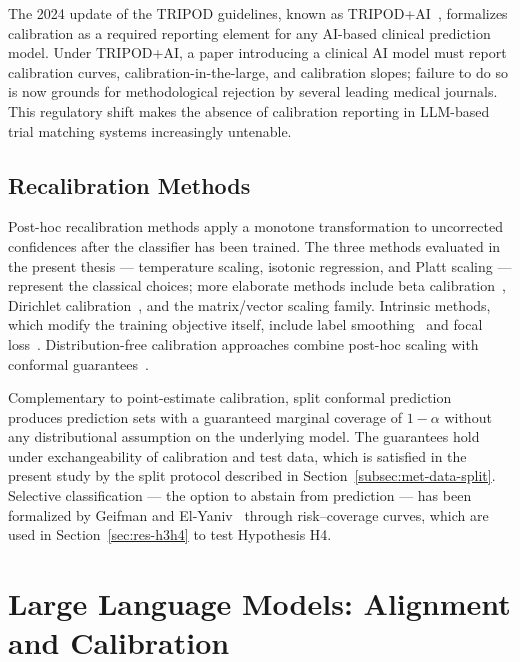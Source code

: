 The 2024 update of the TRIPOD guidelines, known as 
TRIPOD+AI~\cite{collins2024tripod}, formalizes calibration as a 
required reporting element for any AI-based clinical prediction model. 
Under TRIPOD+AI, a paper introducing a clinical AI model must report 
calibration curves, calibration-in-the-large, and calibration slopes; 
failure to do so is now grounds for methodological rejection by 
several leading medical journals. This regulatory shift makes the 
absence of calibration reporting in LLM-based trial matching systems 
increasingly untenable.

\subsection{Recalibration Methods}
\label{subsec:sota-recalibration}

Post-hoc recalibration methods apply a monotone transformation to 
uncorrected confidences after the classifier has been trained. The 
three methods evaluated in the present thesis --- temperature scaling, 
isotonic regression, and Platt scaling --- represent the classical 
choices; more elaborate methods include beta 
calibration~\cite{kull2017beta}, Dirichlet 
calibration~\cite{kull2019dirichlet}, and the matrix/vector scaling 
family. Intrinsic methods, which modify the training objective itself, 
include label smoothing~\cite{muller2019labelsmoothing} and focal 
loss~\cite{mukhoti2020focal}. Distribution-free calibration approaches 
combine post-hoc scaling with conformal 
guarantees~\cite{gupta2021distributionfree}.

Complementary to point-estimate calibration, split conformal 
prediction~\cite{vovk2005, angelopoulos2023conformal} produces 
prediction sets with a guaranteed marginal coverage of $1 - \alpha$ 
without any distributional assumption on the underlying model. The 
guarantees hold under exchangeability of calibration and test data, 
which is satisfied in the present study by the split protocol 
described in Section~\ref{subsec:met-data-split}. Selective 
classification --- the option to abstain from prediction --- has been 
formalized by Geifman and 
El-Yaniv~\cite{geifman2017selective, geifman2019selectivenet} through 
risk--coverage curves, which are used in Section~\ref{sec:res-h3h4} to 
test Hypothesis H4.

\section{Large Language Models: Alignment and Calibration}
\label{sec:sota-llm-calib}


